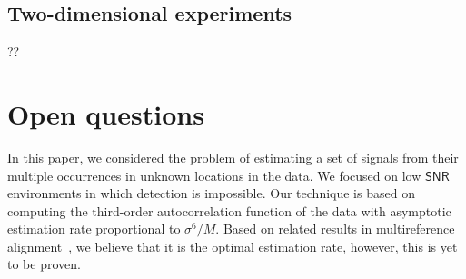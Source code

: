 \documentclass[english,11pt]{article}
\numberwithin{equation}{section}
\theoremstyle{plain}
\theoremstyle{definition}
\theoremstyle{remark}
\theoremstyle{plain}
\theoremstyle{remark}
\theoremstyle{plain}
\theoremstyle{plain}
\newcommand{\SNR}{{\textsf{SNR}}}
\begin{document}
\subsection{Two-dimensional experiments} 


?? 

%
%
% 

\section{Open questions}

In this paper, we considered the problem of estimating a set of signals from their multiple occurrences in unknown locations in the data.  We focused on  low $\SNR$ environments in which detection is impossible. 
Our technique  is based on computing the third-order autocorrelation function of the data with asymptotic estimation rate proportional to $\sigma^6/M$. Based on related results in multireference alignment~\cite{abbe2018estimation}, we believe that it is the optimal estimation rate, however, this is yet to be proven.
\end{document}
